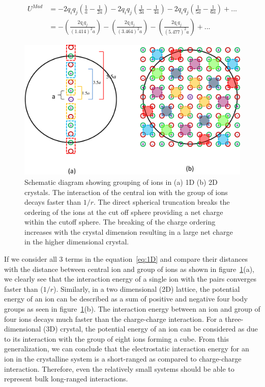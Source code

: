 \begin{equation}
\begin{split}
U^{Mad} & = -2q_iq_j\left(\frac{1}{a}-\frac{1}{2a}\right)-2q_iq_j\left(\frac{1}{3a}-\frac{1}{4a}\right)-2q_iq_j\left(\frac{1}{5a}-\frac{1}{6a}\right) + ... \\
		& = -\left(\frac{ 2q_iq_j}{(1.414)^2a}\right)-\left(\frac{2q_iq_j}{(3.464)^2a}\right)-\left(\frac{2q_iq_j}{(5.477)^2a}\right) +...
\end{split}
\label{eq:1D}
\end{equation} 
 
\begin{figure}
  \centering
  \includegraphics[width=\linewidth]{1D_2DCrystal.pdf}
  \caption{Schematic diagram showing grouping of ions in (a) 1D (b) 2D crystals. The interaction of the central ion with the group of ions decays faster than $1/r$. The direct spherical truncation breaks the ordering of the ions at the cut off sphere providing a net charge within the cutoff sphere. The breaking of the charge ordering increases with the crystal dimension resulting in a large net charge in the higher dimensional crystal.}
   \label{fig:schematic}
\end{figure}

If we consider all 3 terms in the equation~\ref{eq:1D} and compare their distances with the distance between central ion and group of ions as shown in figure~\ref{fig:schematic}(a), we clearly see that the interaction energy of a single ion with the pairs converges faster than ($1/r$). Similarly, in a two dimensional (2D) lattice, the potential energy of an ion can be described as a sum of positive and negative four body groups as seen in figure~\ref{fig:schematic}(b). The interaction energy between an ion and group of four ions decays much faster than the charge-charge interaction. For a three-dimensional (3D) crystal, the potential energy of an ion can be considered as due to its interaction with the group of eight ions forming a cube. From this generalization, we can conclude that the electrostatic interaction energy for an ion in the crystalline system is a short-ranged as compared to charge-charge interaction. Therefore, even the relatively small systems should be able to represent bulk long-ranged interactions.


